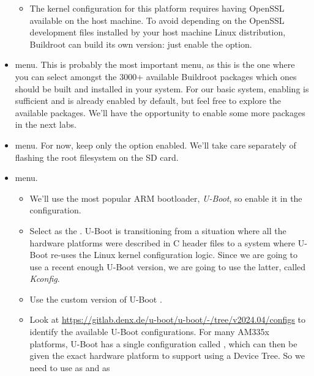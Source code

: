 \begin{itemize}
\begin{itemize}
  \item The kernel configuration for this platform requires having
    OpenSSL available on the host machine. To avoid depending on the
    OpenSSL development files installed by your host machine Linux
    distribution, Buildroot can build its own version: just enable the
     option.

  \end{itemize}

\item {} menu. This is probably the most important
  menu, as this is the one where you can select amongst the 3000+
  available Buildroot packages which ones should be built and
  installed in your system. For our basic system, enabling
   is sufficient and is already enabled by default, but
  feel free to explore the available packages. We'll have the
  opportunity to enable some more packages in the next labs.

\item {} menu. For now, keep only the  option enabled. We'll take care separately of
  flashing the root filesystem on the SD card.

\item {} menu.

  \begin{itemize}

  \item We'll use the most popular ARM bootloader, {\em U-Boot}, so
    enable it in the configuration.

  \item Select  as the . U-Boot is
    transitioning from a situation where all the hardware platforms
    were described in C header files to a system where U-Boot re-uses
    the Linux kernel configuration logic. Since we are going to use a
    recent enough U-Boot version, we are going to use the latter,
    called {\em Kconfig}.

  \item Use the custom version of U-Boot .

  \item Look
    at \url{https://gitlab.denx.de/u-boot/u-boot/-/tree/v2024.04/configs}
    to identify the available U-Boot configurations. For many AM335x
    platforms, U-Boot has a single configuration
    called , which can then be given the
    exact hardware platform to support using a Device Tree. So we need
    to use  as 
    and  as 


\end{itemize}
\end{itemize}
